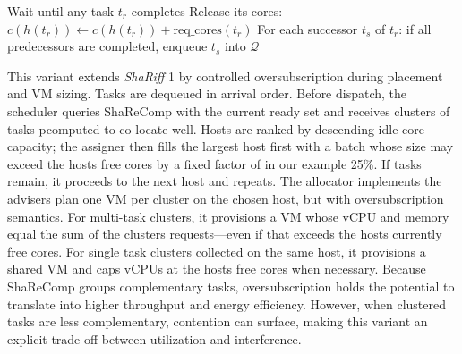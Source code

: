 \begin{algorithm}[H]
{        \BlankLine
        Wait until any task \( t_r \) completes
        Release its cores: \( c(h(t_r)) \gets c(h(t_r)) + \text{req\_cores}(t_r) \)
        For each successor \( t_s \) of \( t_r \): if all predecessors are completed, enqueue \( t_s \) into \( \mathcal{Q} \)
    }
\end{algorithm}

This variant extends \textit{ShaRiff} 1 by controlled oversubscription during placement and VM sizing. Tasks are dequeued in arrival order. Before dispatch, the scheduler queries ShaReComp with the current ready set and receives clusters of tasks pcomputed to co-locate well. Hosts are ranked by descending idle-core capacity; the assigner then fills the largest host first with a batch whose size may exceed the hosts free cores by a fixed factor of in our example 25\%. If tasks remain, it proceeds to the next host and repeats.
The allocator implements the advisers plan one VM per cluster on the chosen host, but with oversubscription semantics. For multi-task clusters, it provisions a VM whose vCPU and memory equal the sum of the clusters requests—even if that exceeds the hosts currently free cores. For single task clusters collected on the same host, it provisions a shared VM and caps vCPUs at the hosts free cores when necessary.
Because ShaReComp groups complementary tasks, oversubscription holds the potential to translate into higher throughput and energy efficiency. However, when clustered tasks are less complementary, contention can surface, making this variant an explicit trade-off between utilization and interference.


